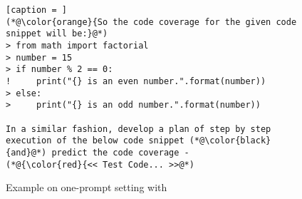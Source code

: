 \begin{wrapfigure}{r}{0.65\textwidth}
\begin{minipage}{.45\textwidth}
\begin{lstlisting}[caption = ]
(*@\color{orange}{So the code coverage for the given code snippet will be:}@*) 
> from math import factorial
> number = 15
> if number % 2 == 0:
!     print("{} is an even number.".format(number))
> else:
>     print("{} is an odd number.".format(number))

In a similar fashion, develop a plan of step by step execution of the below code snippet (*@\color{black}{and}@*) predict the code coverage - 
(*@{\color{red}{<< Test Code... >>@*)
\end{lstlisting}
\end{minipage}
\vspace{-18pt}
\caption{Example on one-prompt setting with {\tool}}
\label{fig:one-prompt}
\end{wrapfigure}
